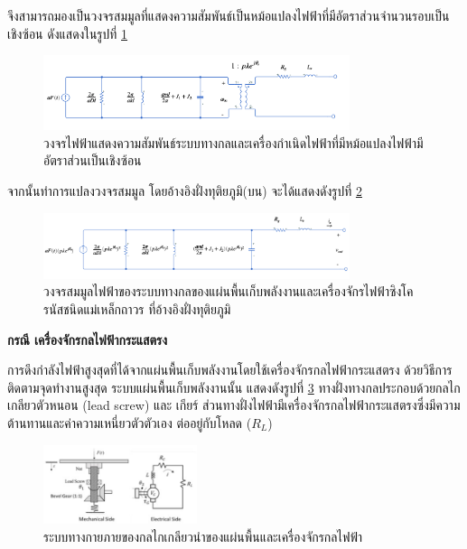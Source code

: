 \documentclass[11pt,a4paper]{article}
\begin{document}
จึงสามารถมองเป็นวงจรสมมูลที่แสดงความสัมพันธ์เป็นหม้อแปลงไฟฟ้าที่มีอัตราส่วนจำนวนรอบเป็นเชิงซ้อน ดังแสดงในรูปที่ \ref{ac_trans}
\begin{figure}[H]
    \begin{center}
        \includegraphics[width=0.8\textwidth]{ac_trans.png}
    \end{center}
    \caption{วงจรไฟฟ้าแสดงความสัมพันธ์ระบบทางกลและเครื่องกำเนิดไฟฟ้าที่มีหม้อแปลงไฟฟ้ามีอัตราส่วนเป็นเชิงซ้อน}
    \label{ac_trans}
\end{figure}

จากนั้นทำการแปลงวงจรสมมูล โดยอ้างอิงฝั่งทุติยภูมิ(บน) จะได้แสดงดังรูปที่ \ref{ac_eq_circuit}
\begin{figure}[H]
    \begin{center}
        \includegraphics[width=0.8\textwidth]{ac_eq_circuit.png}
    \end{center}
    \caption{วงจรสมมูลไฟฟ้าของระบบทางกลของแผ่นพื้นเก็บพลังงานและเครื่องจักรไฟฟ้าซิงโครนัสชนิดแม่เหล็กถาวร ที่อ้างอิงฝั่งทุติยภูมิ}
    \label{ac_eq_circuit}
\end{figure}

\textbf{กรณี เครื่องจักรกลไฟฟ้ากระแสตรง}

การดึงกำลังไฟฟ้าสูงสุดที่ได้จากแผ่นพื้นเก็บพลังงานโดยใช้เครื่องจักรกลไฟฟ้ากระแสตรง ด้วยวิธีการติดตามจุดทำงานสูงสุด
ระบบแผ่นพื้นเก็บพลังงานนั้น แสดงดังรูปที่ \ref{mech_and_dc_motor} ทางฝั่งทางกลประกอบด้วยกลไกเกลียวตัวหนอน (lead screw) และ เกียร์ ส่วนทางฝั่งไฟฟ้ามีเครื่องจักรกลไฟฟ้ากระแสตรงซึ่งมีความต้านทานและค่าความเหนี่ยวตัวตัวเอง ต่ออยู่กับโหลด ($R_{L}$)
\begin{figure}[H]
    \begin{center}
        \includegraphics[width=0.4\textwidth]{mech_and_dc_motor.jpg}
    \end{center}
    \caption{ระบบทางกายภายของกลไกเกลียวนำของแผ่นพื้นและเครื่องจักรกลไฟฟ้า}
    \label{mech_and_dc_motor}
\end{figure}
\end{document}
